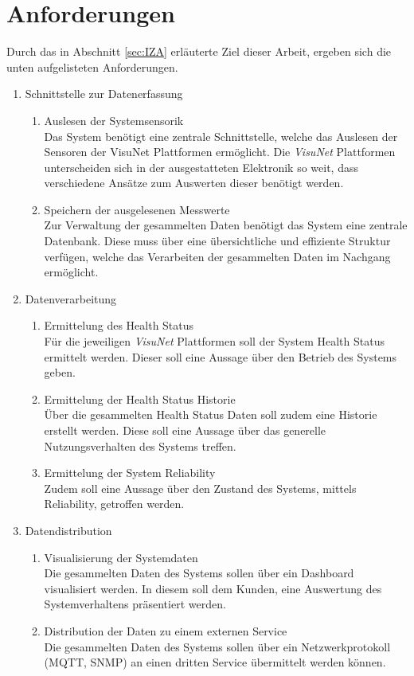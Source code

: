 \section{Anforderungen}\label{sec:Anforderungen}
Durch das in Abschnitt \ref{sec:IZA} erläuterte Ziel dieser Arbeit, ergeben sich die unten aufgelisteten Anforderungen.
\begin{enumerate}
    \item Schnittstelle zur Datenerfassung
    \begin{enumerate}
        \item Auslesen der Systemsensorik\\
        Das System benötigt eine zentrale Schnittstelle, welche das Auslesen der Sensoren der VisuNet Plattformen ermöglicht. Die \textit{VisuNet} Plattformen unterscheiden sich in der ausgestatteten Elektronik so weit, dass verschiedene Ansätze zum Auswerten dieser benötigt werden. 
        \item Speichern der ausgelesenen Messwerte\\
        Zur Verwaltung der gesammelten Daten benötigt das System eine zentrale Datenbank. Diese muss über eine übersichtliche und effiziente Struktur verfügen, welche das Verarbeiten der gesammelten Daten im Nachgang ermöglicht.
    \end{enumerate}
    
    \item Datenverarbeitung
    \begin{enumerate}
        \item Ermittelung des Health Status\\
        Für die jeweiligen \textit{VisuNet} Plattformen soll der System Health Status ermittelt werden. Dieser soll eine Aussage über den Betrieb des Systems geben. 
        \item Ermittelung der Health Status Historie\\
        Über die gesammelten Health Status Daten soll zudem eine Historie erstellt werden. Diese soll eine Aussage über das generelle Nutzungsverhalten des Systems treffen. 
        \item Ermittelung der System Reliability\\
        Zudem soll eine Aussage über den Zustand des Systems, mittels Reliability, getroffen werden. 
    \end{enumerate}

    \item Datendistribution
    \begin{enumerate}
        \item Visualisierung der Systemdaten\\
        Die gesammelten Daten des Systems sollen über ein Dashboard visualisiert werden. In diesem soll dem Kunden, eine Auswertung des Systemverhaltens präsentiert werden. 
        \item Distribution der Daten zu einem externen Service\\
        Die gesammelten Daten des Systems sollen über ein Netzwerkprotokoll (MQTT, SNMP) an einen dritten Service übermittelt werden können.
    \end{enumerate}

   \end{enumerate}

